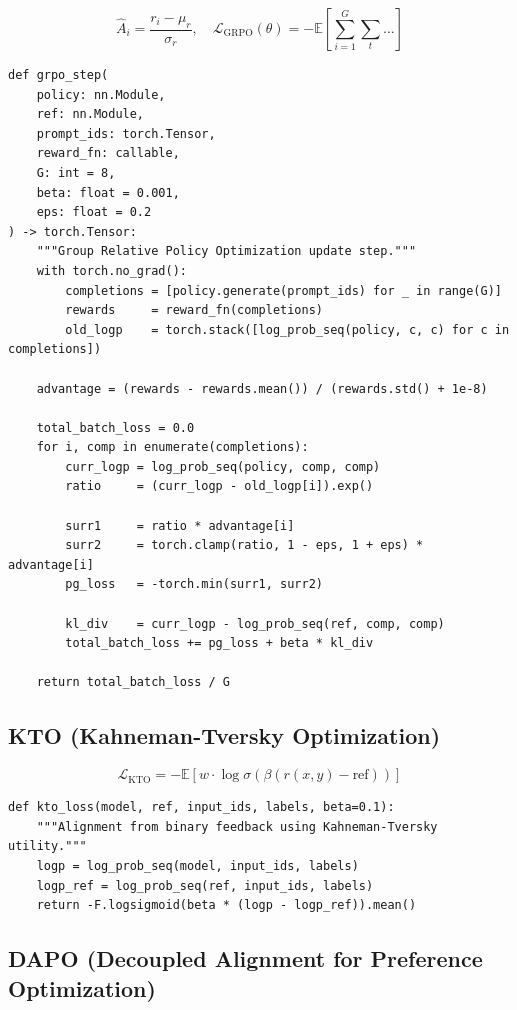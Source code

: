 \[
  \hat{A}_i = \frac{r_i - \mu_r}{\sigma_r}, \quad \mathcal{L}_\mathrm{GRPO}(\theta) = -\mathbb{E}\!\left[\sum_{i=1}^{G}\sum_t \dots \right]
\]

\begin{lstlisting}[style=pythonstyle, caption={GRPO update step}, label=lst:grpo]
def grpo_step(
    policy: nn.Module, 
    ref: nn.Module, 
    prompt_ids: torch.Tensor, 
    reward_fn: callable,
    G: int = 8, 
    beta: float = 0.001, 
    eps: float = 0.2
) -> torch.Tensor:
    """Group Relative Policy Optimization update step."""
    with torch.no_grad():
        completions = [policy.generate(prompt_ids) for _ in range(G)]
        rewards     = reward_fn(completions)
        old_logp    = torch.stack([log_prob_seq(policy, c, c) for c in completions])

    advantage = (rewards - rewards.mean()) / (rewards.std() + 1e-8)

    total_batch_loss = 0.0
    for i, comp in enumerate(completions):
        curr_logp = log_prob_seq(policy, comp, comp)
        ratio     = (curr_logp - old_logp[i]).exp()
        
        surr1     = ratio * advantage[i]
        surr2     = torch.clamp(ratio, 1 - eps, 1 + eps) * advantage[i]
        pg_loss   = -torch.min(surr1, surr2)

        kl_div    = curr_logp - log_prob_seq(ref, comp, comp)
        total_batch_loss += pg_loss + beta * kl_div

    return total_batch_loss / G
\end{lstlisting}

\subsection{KTO (Kahneman-Tversky Optimization)}
\label{form:kto}

\[
  \mathcal{L}_\mathrm{KTO} = -\mathbb{E}[w \cdot \log \sigma(\beta(r(x,y) - \text{ref}))]
\]

\begin{lstlisting}[style=pythonstyle, caption={KTO loss}, label=lst:kto]
def kto_loss(model, ref, input_ids, labels, beta=0.1):
    """Alignment from binary feedback using Kahneman-Tversky utility."""
    logp = log_prob_seq(model, input_ids, labels)
    logp_ref = log_prob_seq(ref, input_ids, labels)
    return -F.logsigmoid(beta * (logp - logp_ref)).mean()
\end{lstlisting}

\subsection{DAPO (Decoupled Alignment for Preference Optimization)}
\label{form:dapo}

